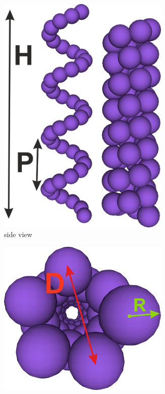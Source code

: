 \begin{figure}[htb]
\begin{subfigure}[b]{.48\textwidth}
   \centering
   \includegraphics[width=0.9\textwidth]{../images/form_factor/cylindrical_obj/beads_helix_model_1.png}
   \caption{side view}
   \label{fig:beadshelixside1}
\end{subfigure}
\hfill
\begin{subfigure}[b]{.48\textwidth}
   \centering
   \includegraphics[width=0.9\textwidth]{../images/form_factor/cylindrical_obj/beads_helix_model_2.png}

\end{subfigure}
\end{figure}
